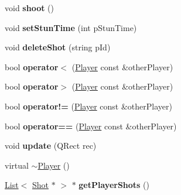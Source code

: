 \begin{DoxyCompactItemize}
\item 
\hypertarget{class_player_a4cdc67fd9ca2de09af89d9ae19efe5f8}{void {\bfseries shoot} ()}\label{class_player_a4cdc67fd9ca2de09af89d9ae19efe5f8}

\item 
\hypertarget{class_player_ae02c3ddb3bff99fd2375c552e51b8560}{void {\bfseries set\-Stun\-Time} (int p\-Stun\-Time)}\label{class_player_ae02c3ddb3bff99fd2375c552e51b8560}

\item 
\hypertarget{class_player_a4f5d43c9f4394429fef4106715529ed7}{void {\bfseries delete\-Shot} (string p\-Id)}\label{class_player_a4f5d43c9f4394429fef4106715529ed7}

\item 
\hypertarget{class_player_a7a3afa150767d2c07968dc6d04b145b8}{bool {\bfseries operator$<$} (\hyperlink{class_player}{Player} const \&other\-Player)}\label{class_player_a7a3afa150767d2c07968dc6d04b145b8}

\item 
\hypertarget{class_player_aee44ed3cca127251cf0f65102c89dd8f}{bool {\bfseries operator$>$} (\hyperlink{class_player}{Player} const \&other\-Player)}\label{class_player_aee44ed3cca127251cf0f65102c89dd8f}

\item 
\hypertarget{class_player_a78258f14f551447cb997c91ada49ade6}{bool {\bfseries operator!=} (\hyperlink{class_player}{Player} const \&other\-Player)}\label{class_player_a78258f14f551447cb997c91ada49ade6}

\item 
\hypertarget{class_player_a3221fef8a645a3d9b40eb2e3594b3f60}{bool {\bfseries operator==} (\hyperlink{class_player}{Player} const \&other\-Player)}\label{class_player_a3221fef8a645a3d9b40eb2e3594b3f60}

\item 
\hypertarget{class_player_a324a27f8b07cc82afe1c4cb67906a964}{void {\bfseries update} (Q\-Rect rec)}\label{class_player_a324a27f8b07cc82afe1c4cb67906a964}

\item 
virtual \hyperlink{class_player_a749d2c00e1fe0f5c2746f7505a58c062}{$\sim$\-Player} ()
\item 
\hypertarget{class_player_ab221ec831c2a110ae5b631c782b6dbe7}{\hyperlink{class_list}{List}$<$ \hyperlink{class_shot}{Shot} $\ast$ $>$ $\ast$ {\bfseries get\-Player\-Shots} ()}\label{class_player_ab221ec831c2a110ae5b631c782b6dbe7}

\end{DoxyCompactItemize}


